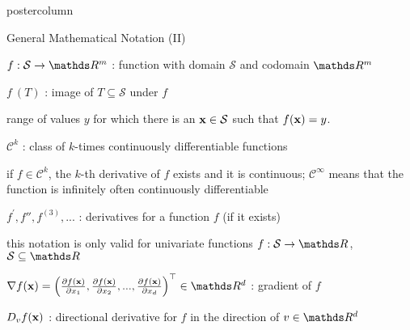 \documentclass{beamer}
\begin{document}
\begin{frame}[fragile]{}
\begin{columns}
\begin{column}{.31\textwidth}
\begin{beamercolorbox}[center]{postercolumn}
\begin{minipage}{.98\textwidth}
{						\begin{myblock}{General Mathematical Notation (II)}
						\begin{codebox}
							 $f: \mathcal{S} \to \R^m$ : function with domain $\mathcal{S}$ and codomain $\R^m$
						\end{codebox}
						\hspace*{1ex}  %
						\begin{codebox}
							 $f~(T)$ : image of $T \subseteq \mathcal{S}$ under $f$
						\end{codebox}
						\hspace*{1ex} range of values $y$ for which there is an $\mathbf{x} \in \mathcal{S}$ such that $f(\mathbf{x}) = y$. \\
						\begin{codebox}
							 $\mathcal{C}^k$ : class of $k$-times continuously differentiable functions
						\end{codebox}
						\hspace*{1ex} if $f \in \mathcal{C}^k$, the $k$-th derivative of $f$ exists and it is continuous; $\mathcal{C}^\infty$ means that the function is infinitely often continuously differentiable \\
						\begin{codebox}
							 $f^\prime, f'', f^{(3)}, ...$ : derivatives for a function $f$ (if it exists)
						\end{codebox}
						\hspace*{1ex} this notation is only valid for univariate functions $f: \mathcal{S} \to \R$, $\mathcal{S} \subseteq \R$ \\
						\begin{codebox}
							 $\nabla f(\xv) = \left(\frac{\partial f(\xv)}{\partial x_1}, \frac{\partial f(\xv)}{\partial x_2}, ..., \frac{\partial f(\xv)}{\partial x_d}\right)^\top \in \R^d$ : gradient of $f$
						\end{codebox}
						\hspace*{1ex} %
						\begin{codebox}
							 $D_v f(\mathbf{x})$ : directional derivative for $f$ in the direction of $v \in \R^d$
						\end{codebox}
						\hspace*{1ex} %

\end{myblock}}
\end{minipage}
\end{beamercolorbox}
\end{column}
\end{columns}
\end{frame}
\end{document}
